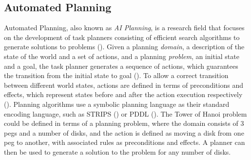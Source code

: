 \subsection{Automated Planning}
Automated Planning, also known as \textit{AI Planning}, is a research field that focuses on the development of task planners consisting of efficient search algorithms to generate solutions to problems (\cite{ghallab2004automated}).
Given a planning \textit{domain}, \ie a description of the state of the world and a set of actions, and a planning \textit{problem}, \ie an initial state and a goal, the task planner generates a sequence of actions, which guarantees the transition from the initial state to goal ().
To allow a correct transition between different world states, actions are defined in terms of preconditions and effects, which represent states before and after the action execution respectively ().
Planning algorithms use a symbolic planning language as their standard encoding language, such as STRIPS (\cite{fikes1971strips}) or PDDL (\cite{ghallab2004automated}).
The Tower of Hanoi problem could be defined in terms of a planning problem, where the domain consists of 3 pegs and a number of disks, and the action is defined as moving a disk from one peg to another, with associated rules as preconditions and effects.
A planner can then be used to generate a solution to the problem for any number of disks.


